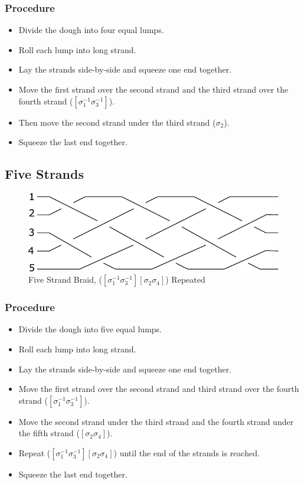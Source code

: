 \documentclass[10pt, openany]{book}
\begin{document}
\subsubsection{Procedure}
\begin{itemize}
  \item Divide the dough into four equal lumps.
  \item Roll each lump into long strand.
  \item Lay the strands side-by-side and squeeze one end together.
  \item Move the first strand over the second strand and the third strand over the fourth strand ($[\sigma^{-1}_1\sigma^{-1}_3]$).
  \item Then move the second strand under the third strand ($\sigma_2$).
  \item Squeeze the last end together.
\end{itemize}

\subsection{Five Strands}

\begin{figure}[h]
  \center
  \includegraphics{Figures/5-strands.pdf}
  \caption{Five Strand Braid, ($[\sigma^{-1}_1 \sigma^{-1}_3][\sigma_2\sigma_4]$) Repeated}
  \label{fig:5Strand}
\end{figure}

\subsubsection{Procedure}
\begin{itemize}
  \item Divide the dough into five equal lumps.
  \item Roll each lump into long strand.
  \item Lay the strands side-by-side and squeeze one end together.
  \item Move the first strand over the second strand and third strand over the fourth strand ($[\sigma^{-1}_1 \sigma^{-1}_3]$).
  \item Move the second strand under the third strand and the fourth strand under the fifth strand ($[\sigma_2\sigma_4]$).
  \item Repeat ($[\sigma^{-1}_1 \sigma^{-1}_3][\sigma_2\sigma_4]$) until the end of the strands is reached.
  \item Squeeze the last end together.
\end{itemize}
\end{document}
